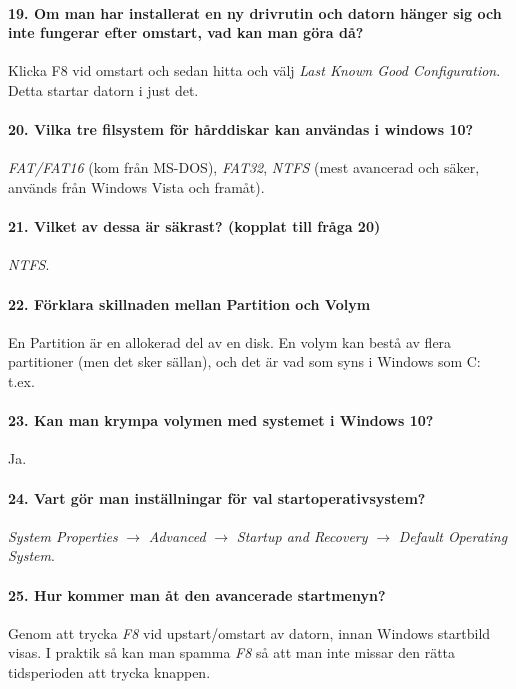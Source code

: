\paragraph{19. Om man har installerat en ny drivrutin och datorn hänger sig och inte fungerar efter omstart, vad kan man göra då?} Klicka F8 vid omstart och sedan hitta och välj \textit{Last Known Good Configuration}. Detta startar datorn i just det.

\paragraph{20. Vilka tre filsystem för hårddiskar kan användas i windows 10?} \textit{FAT/FAT16} (kom från MS-DOS), \textit{FAT32}, \textit{NTFS} (mest avancerad och säker, används från Windows Vista och framåt).

\paragraph{21. Vilket av dessa är säkrast? (kopplat till fråga 20)} \textit{NTFS}.

\paragraph{22. Förklara skillnaden mellan Partition och Volym}
En Partition är en allokerad del av en disk. En volym kan bestå av flera partitioner (men det sker sällan), och det är vad som syns i Windows som C: t.ex.

\paragraph{23. Kan man krympa volymen med systemet i Windows 10?} Ja. 

\paragraph{24. Vart gör man inställningar för val startoperativsystem?}
\textit{System Properties} $\rightarrow$ \textit{Advanced} $\rightarrow$ \textit{Startup and Recovery} $\rightarrow$ \textit{Default Operating System}.

\paragraph{25. Hur kommer man åt den avancerade startmenyn?}
Genom att trycka \textit{F8} vid upstart/omstart av datorn, innan Windows startbild visas. I praktik så kan man spamma \textit{F8} så att man inte missar den rätta tidsperioden att trycka knappen.

